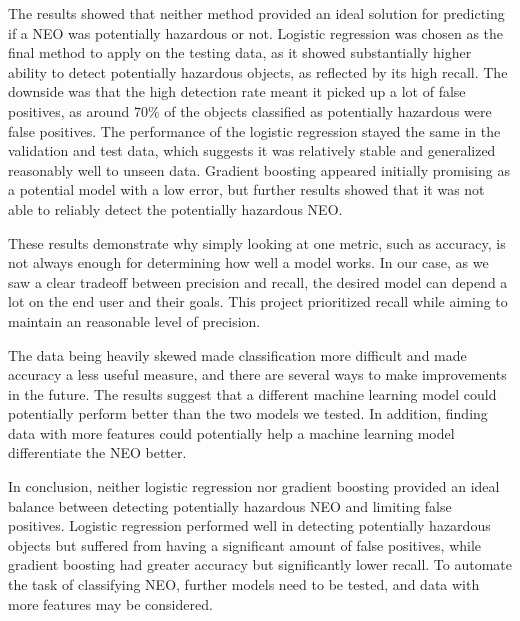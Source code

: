 \documentclass{article}
\begin{document}
The results showed that neither method provided an ideal solution for predicting if a NEO was potentially hazardous or not. Logistic regression was chosen as the final method to apply on the testing data, as it showed substantially higher ability to detect potentially hazardous objects, as reflected by its high recall. The downside was that the high detection rate meant it picked up a lot of false positives, as around 70\% of the objects classified as potentially hazardous were false positives. The performance of the logistic regression stayed the same in the validation and test data, which suggests it was relatively stable and generalized reasonably well to unseen data. Gradient boosting appeared initially promising as a potential model with a low error, but further results showed that it was not able to reliably detect the potentially hazardous NEO.

\vspace{1em}


 These results demonstrate why simply looking at one metric, such as accuracy, is not always enough for determining how well a model works. In our case, as we saw a clear tradeoff between precision and recall, the desired model can depend a lot on the end user and their goals. This project prioritized recall while aiming to maintain an reasonable level of precision.

 \vspace{1em}

 The data being heavily skewed made classification more difficult and made accuracy a less useful measure, and there are several ways to make improvements in the future. The results suggest that a different machine learning model could potentially perform better than the two models we tested. In addition, finding data with more features could potentially help a machine learning model differentiate the NEO better.

 \vspace{1em}

In conclusion, neither logistic regression nor gradient boosting provided an ideal balance between detecting potentially hazardous NEO and limiting false positives. Logistic regression performed well in detecting potentially hazardous objects but suffered from having a significant amount of false positives, while gradient boosting had greater accuracy but significantly lower recall. To automate the task of classifying NEO, further models need to be tested, and data with more features may be considered.
 
\end{document}
